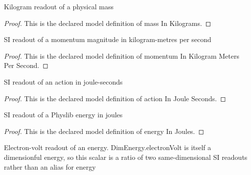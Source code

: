 \begin{definition}
  \label{def:physics:phyx-mini-0557:phyxminiproblems-problemphyxmini0557-massinkilograms}
  Kilogram readout of a physical mass
\end{definition}
\begin{proof}
  This is the declared model definition of mass In Kilograms.
\end{proof}
\begin{definition}
  \label{def:physics:phyx-mini-0557:phyxminiproblems-problemphyxmini0557-momentuminkilogrammeterspersecond}
  SI readout of a momentum magnitude in kilogram-metres per second
\end{definition}
\begin{proof}
  This is the declared model definition of momentum In Kilogram Meters Per Second.
\end{proof}
\begin{definition}
  \label{def:physics:phyx-mini-0557:phyxminiproblems-problemphyxmini0557-actioninjouleseconds}
  SI readout of an action in joule-seconds
\end{definition}
\begin{proof}
  This is the declared model definition of action In Joule Seconds.
\end{proof}
\begin{definition}
  \label{def:physics:phyx-mini-0557:phyxminiproblems-problemphyxmini0557-energyinjoules}
  SI readout of a Physlib energy in joules
\end{definition}
\begin{proof}
  This is the declared model definition of energy In Joules.
\end{proof}
\begin{definition}
  \label{def:physics:phyx-mini-0557:phyxminiproblems-problemphyxmini0557-energyinelectronvolts}
  Electron-volt readout of an energy. DimEnergy.electronVolt is itself a dimensionful energy, so this scalar is a ratio of two same-dimensional SI readouts rather than an alias for energy
\end{definition}
